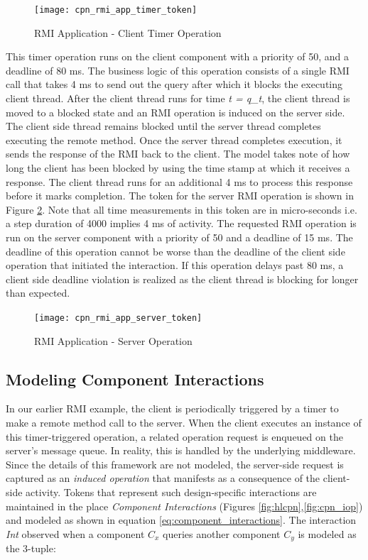 \begin{figure}[ht]
	\centering
	\texttt{[image: cpn\_rmi\_app\_timer\_token]}
	\caption{RMI Application - Client Timer Operation}
	\label{fig:cpn_rmi_app_timer_token}
\end{figure}

This timer operation runs on the client component with a priority of 50, and a deadline of 80 ms. The business logic of this operation consists of a single RMI call that takes 4 ms to send out the query after which it blocks the executing client thread. After the client thread runs for time \emph{t = q\_t}, the client thread is moved to a blocked state and an RMI operation is induced on the server side. The client side thread remains blocked until the server thread completes executing the remote method. Once the server thread completes execution, it sends the response of the RMI back to the client. The model takes note of how long the client has been blocked by using the time stamp at which it receives a response. The client thread runs for an additional 4 ms to process this response before it marks completion. The token for the server RMI operation is shown in Figure \ref{fig:cpn_rmi_app_server_token}. Note that all time measurements in this token are in micro-seconds i.e. a step duration of 4000 implies 4 ms of activity. The requested RMI operation is run on the server component with a priority of 50 and a deadline of 15 ms. The deadline of this operation cannot be worse than the deadline of the client side operation that initiated the interaction. If this operation delays past 80 ms, a client side deadline violation is realized as the client thread is blocking for longer than expected. 

\begin{figure}[ht]
	\centering
	\texttt{[image: cpn\_rmi\_app\_server\_token]}
	\caption{RMI Application - Server Operation}
	\label{fig:cpn_rmi_app_server_token}
\end{figure}


\subsection{Modeling Component Interactions}

In our earlier RMI example, the client is periodically triggered by a timer to make a remote method call to the server. When the client executes an instance of this timer-triggered operation, a related operation request is enqueued on the server's message queue. In reality, this is handled by the underlying middleware. Since the details of this framework are not modeled, the server-side request is captured as an \emph{induced operation} that manifests as a consequence of the client-side activity. Tokens that represent such design-specific interactions are maintained in the place \emph{Component Interactions} (Figures \ref{fig:hlcpn},\ref{fig:cpn_iop}) and modeled as shown in equation \ref{eq:component_interactions}. The interaction \emph{Int} observed when a component $C_x$ queries another component $C_y$ is modeled as the 3-tuple:

